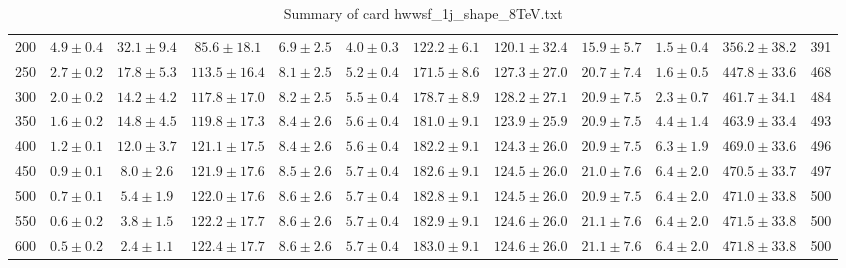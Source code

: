 \begin{table}
{\begin{center}
\begin{tabular}{l | c c | c c c c c c c | c c}
200 & $4.9\pm0.4$ & $32.1\pm9.4$ & $85.6\pm18.1$ & $6.9\pm2.5$ & $4.0\pm0.3$ & $122.2\pm6.1$ & $120.1\pm32.4$ & $15.9\pm5.7$ & $1.5\pm0.4$ & $356.2\pm38.2$ & 391 \\
250 & $2.7\pm0.2$ & $17.8\pm5.3$ & $113.5\pm16.4$ & $8.1\pm2.5$ & $5.2\pm0.4$ & $171.5\pm8.6$ & $127.3\pm27.0$ & $20.7\pm7.4$ & $1.6\pm0.5$ & $447.8\pm33.6$ & 468 \\
300 & $2.0\pm0.2$ & $14.2\pm4.2$ & $117.8\pm17.0$ & $8.2\pm2.5$ & $5.5\pm0.4$ & $178.7\pm8.9$ & $128.2\pm27.1$ & $20.9\pm7.5$ & $2.3\pm0.7$ & $461.7\pm34.1$ & 484 \\
350 & $1.6\pm0.2$ & $14.8\pm4.5$ & $119.8\pm17.3$ & $8.4\pm2.6$ & $5.6\pm0.4$ & $181.0\pm9.1$ & $123.9\pm25.9$ & $20.9\pm7.5$ & $4.4\pm1.4$ & $463.9\pm33.4$ & 493 \\
400 & $1.2\pm0.1$ & $12.0\pm3.7$ & $121.1\pm17.5$ & $8.4\pm2.6$ & $5.6\pm0.4$ & $182.2\pm9.1$ & $124.3\pm26.0$ & $20.9\pm7.5$ & $6.3\pm1.9$ & $469.0\pm33.6$ & 496 \\
450 & $0.9\pm0.1$ & $8.0\pm2.6$ & $121.9\pm17.6$ & $8.5\pm2.6$ & $5.7\pm0.4$ & $182.6\pm9.1$ & $124.5\pm26.0$ & $21.0\pm7.6$ & $6.4\pm2.0$ & $470.5\pm33.7$ & 497 \\
500 & $0.7\pm0.1$ & $5.4\pm1.9$ & $122.0\pm17.6$ & $8.6\pm2.6$ & $5.7\pm0.4$ & $182.8\pm9.1$ & $124.5\pm26.0$ & $20.9\pm7.5$ & $6.4\pm2.0$ & $471.0\pm33.8$ & 500 \\
550 & $0.6\pm0.2$ & $3.8\pm1.5$ & $122.2\pm17.7$ & $8.6\pm2.6$ & $5.7\pm0.4$ & $182.9\pm9.1$ & $124.6\pm26.0$ & $21.1\pm7.6$ & $6.4\pm2.0$ & $471.5\pm33.8$ & 500 \\
600 & $0.5\pm0.2$ & $2.4\pm1.1$ & $122.4\pm17.7$ & $8.6\pm2.6$ & $5.7\pm0.4$ & $183.0\pm9.1$ & $124.6\pm26.0$ & $21.1\pm7.6$ & $6.4\pm2.0$ & $471.8\pm33.8$ & 500 \\
\hline
\end{tabular}
\end{center}
}
\caption{Summary of card hwwsf\_1j\_shape\_8TeV.txt}
\end{table}
